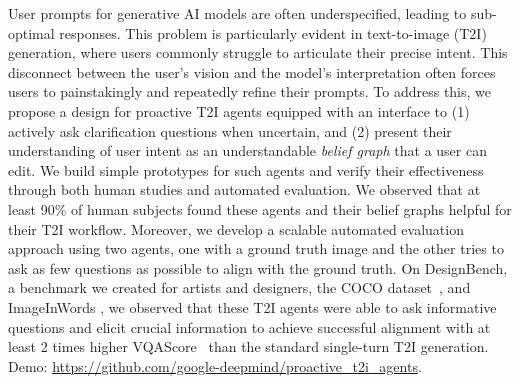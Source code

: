 

User prompts for generative AI models are often underspecified, leading to sub-optimal responses. This problem is particularly evident in text-to-image (T2I) generation, where users commonly struggle to articulate their precise intent. This disconnect between the user's vision and the model's interpretation often forces users to painstakingly and repeatedly refine their prompts. To address this, we propose a design for proactive T2I agents equipped with an interface to (1) actively ask clarification questions when uncertain, and (2) present their understanding of user intent as an understandable \emph{belief graph} that a user can edit. We build simple prototypes for such agents and verify their effectiveness through both human studies and automated evaluation. We observed that at least 90\% of human subjects found these agents and their belief graphs helpful for their T2I workflow. Moreover, we develop a scalable automated evaluation approach using two agents, one with a ground truth image and the other tries to ask as few questions as possible to align with the ground truth. On DesignBench, a benchmark we created for artists and designers, the COCO dataset~\citep{lin2014microsoft}, and ImageInWords \citep{garg2024imageinwordsunlockinghyperdetailedimage}, we observed that these T2I agents were able to ask informative questions and elicit crucial information to achieve successful alignment with at least 2 times higher VQAScore~\citep{lin2024evaluatingtexttovisualgenerationimagetotext} than the standard single-turn T2I generation. Demo: \url{https://github.com/google-deepmind/proactive_t2i_agents}.%
